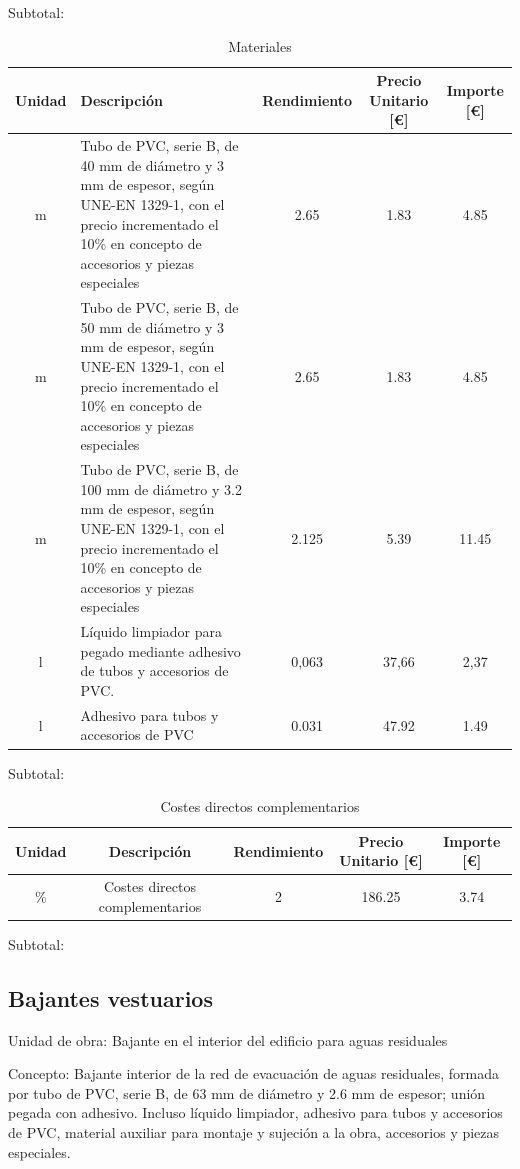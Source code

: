 \documentclass[../main.tex]{subfiles}
\begin{document}
Subtotal:

\begin{table}[H]
    \centering
    \begin{tabular}{c|p{5.5cm}|c|c|c}
    Unidad & Descripción & Rendimiento & Precio Unitario [€] & Importe [€] \\ \hline
    m& Tubo de PVC, serie B, de 40 mm de diámetro y 3 mm de espesor, según UNE-EN 1329-1, con el precio incrementado el 10\% en concepto de accesorios y piezas especiales & 2.65 & 1.83 & 4.85\\
    m& Tubo de PVC, serie B, de 50 mm de diámetro y 3 mm de espesor, según UNE-EN 1329-1, con el precio incrementado el 10\% en concepto de accesorios y piezas especiales & 2.65 & 1.83 & 4.85\\
    m& Tubo de PVC, serie B, de 100 mm de diámetro y 3.2 mm de espesor, según UNE-EN 1329-1, con el precio incrementado el 10\% en concepto de accesorios y piezas especiales & 2.125 & 5.39 & 11.45\\
    l & Líquido limpiador para pegado mediante adhesivo de tubos y accesorios de PVC. & 0,063 & 37,66 & 2,37 \\
    l & Adhesivo para tubos y accesorios de PVC & 0.031 & 47.92 & 1.49 \\
    
    \end{tabular}
    \caption{Materiales}
\end{table}

Subtotal:

\begin{table}[H]
    \centering
    \begin{tabular}{c|c|c|c|c}
    Unidad & Descripción & Rendimiento & Precio Unitario [€] & Importe [€] \\ \hline
    \% & Costes directos complementarios & 2 & 186.25 & 3.74 \\
    \end{tabular}
    \caption{Costes directos complementarios}
\end{table} 

Subtotal:

\subsection{Bajantes vestuarios}

Unidad de obra: Bajante en el interior del edificio para aguas residuales

Concepto: Bajante interior de la red de evacuación de aguas residuales, formada por tubo de PVC, serie B, de 63 mm de diámetro y 2.6 mm de espesor; unión pegada con adhesivo. Incluso líquido limpiador, adhesivo para tubos y accesorios de PVC, material auxiliar para montaje y sujeción a la obra, accesorios y piezas especiales.
\end{document}
